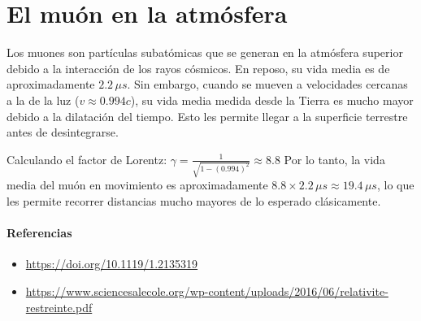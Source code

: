 \documentclass{article}
\begin{document}

\section{El muón en la atmósfera}

Los muones son partículas subatómicas que se generan en la atmósfera superior debido a la interacción de los rayos cósmicos. En reposo, su vida media es de aproximadamente $2.2 \, \mu s$. Sin embargo, cuando se mueven a velocidades cercanas a la de la luz ($v \approx 0.994c$), su vida media medida desde la Tierra es mucho mayor debido a la dilatación del tiempo. Esto les permite llegar a la superficie terrestre antes de desintegrarse.

Calculando el factor de Lorentz:
$
\gamma = \frac{1}{\sqrt{1 - (0.994)^2}} \approx 8.8
$
Por lo tanto, la vida media del muón en movimiento es aproximadamente $8.8 \times 2.2 \, \mu s \approx 19.4 \, \mu s$, lo que les permite recorrer distancias mucho mayores de lo esperado clásicamente.

\paragraph{Referencias}

\begin{itemize}
    \item \url{https://doi.org/10.1119/1.2135319}

    \item \scriptsize{\url{https://www.sciencesalecole.org/wp-content/uploads/2016/06/relativite-restreinte.pdf}}
\end{itemize}


\end{document}
